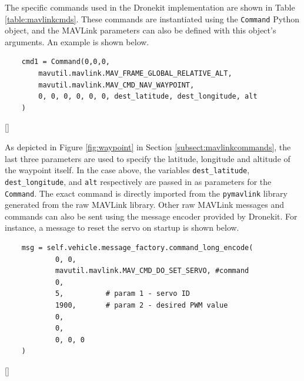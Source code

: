 The specific commands used in the Dronekit implementation are shown in Table \ref{table:mavlinkcmds}. These commands are instantiated using the \texttt{Command} Python object, and the MAVLink parameters can also be defined with this object's arguments. An example is shown below.

\begin{verbatim}
    cmd1 = Command(0,0,0,
        mavutil.mavlink.MAV_FRAME_GLOBAL_RELATIVE_ALT,
        mavutil.mavlink.MAV_CMD_NAV_WAYPOINT, 
        0, 0, 0, 0, 0, 0, dest_latitude, dest_longitude, alt
    )
\end{verbatim}[]

As depicted in Figure \ref{fig:waypoint} in Section \ref{subsect:mavlinkcommands}, the last three parameters are used to specify the latitude, longitude and altitude of the waypoint itself. In the case above, the variables \texttt{dest\_latitude}, \texttt{dest\_longitude}, and \texttt{alt} respectively are passed in as parameters for the \texttt{Command}. The exact command is directly imported from the \texttt{pymavlink} library generated from the raw MAVLink library. Other raw MAVLink messages and commands can also be sent using the message encoder provided by Dronekit. For instance, a message to reset the servo on startup is shown below.

\begin{verbatim}
    msg = self.vehicle.message_factory.command_long_encode(
            0, 0,
            mavutil.mavlink.MAV_CMD_DO_SET_SERVO, #command
            0, 
            5,          # param 1 - servo ID
            1900,       # param 2 - desired PWM value
            0,          
            0, 
            0, 0, 0
    )
\end{verbatim}[]





